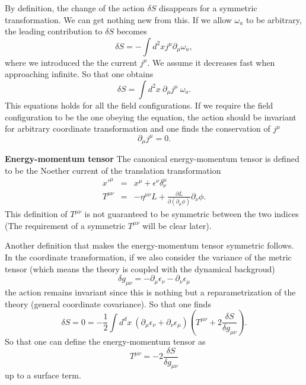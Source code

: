 \documentclass[submission, PhysLectNotes]{SciPost}
\begin{document}
By definition, the change of the action $\delta S$ disappears for a symmetric transformation. We can get nothing new from this. If we allow $\omega_a$ to be arbitrary, the leading contribution to $\delta S$ becomes
\begin{equation}
    \delta S = -\int d^2x j^\mu \partial_\mu \omega_a,
\end{equation}
where we introduced the the current $j^\mu$. We assume it decreases fast when approaching infinite. So that one obtains
\begin{equation}
    \delta S = \int d^2x\ \partial_\mu j^\mu \ \omega_a.
\end{equation}
This equations holds for all the field configurations. If we require the field configuration to be the one obeying the equation, the action should be invariant for arbitrary coordinate transformation and one finds the conservation of $j^\mu$
\begin{equation}
    \partial_\mu j^\mu = 0.
\end{equation}

{\bf Energy-momentum tensor}
The canonical energy-momentum tensor is defined to be the Noether current of the translation transformation
\begin{eqnarray}
    x'^\mu &=& x^\mu + \epsilon^\nu \delta^\mu_\nu \\
    T^{\mu\nu} &=& -\eta^{\mu\nu} L + \frac{\partial L}{\partial(\partial_\mu \phi)}\partial_\nu \phi.
\end{eqnarray}
This definition of $T^{\mu\nu}$ is not guaranteed to be symmetric between the two indices (The requirement of a symmetric $T^{\mu\nu}$ will be clear later).

Another definition that makes the energy-momentum tensor symmetric follows. In the coordinate transformation, if we also consider the variance of the metric tensor (which means the theory is coupled with the dynamical backgroud)
\begin{equation}
\delta g_{\mu\nu} = -\partial_\mu\epsilon_\nu -\partial_\nu\epsilon_\mu
\end{equation}
the action remains invariant since this is nothing but a reparametrization of the theory (general coordinate covariance). So that one finds
\begin{equation}
    \delta S = 0 = -\frac{1}{2} \int d^dx \ \left(\partial_\mu\epsilon_\nu + \partial_\nu\epsilon_\mu\right) \left(T^{\mu\nu} +2\frac{\delta S}{\delta g_{\mu\nu}}\right).
\end{equation}
So that one can define the energy-momentum tensor as
\begin{equation}
    T^{\mu\nu} = -2\frac{\delta S}{\delta g_{\mu\nu}}
\end{equation}
up to a surface term.
\end{document}

